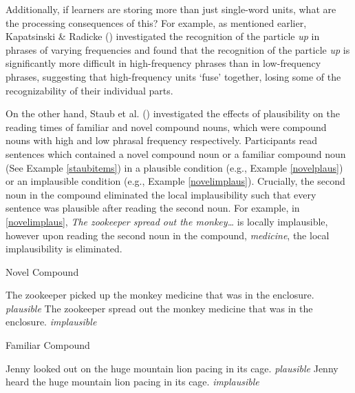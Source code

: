 \documentclass[
  12pt,
  letterpaper,
]{scrreport}
\begin{document}
Additionally, if learners are storing more than just single-word units,
what are the processing consequences of this? For example, as mentioned
earlier, Kapatsinski \& Radicke
()
investigated the recognition of the particle \emph{up} in phrases of
varying frequencies and found that the recognition of the particle
\emph{up} is significantly more difficult in high-frequency phrases than
in low-frequency phrases, suggesting that high-frequency units `fuse'
together, losing some of the recognizability of their individual parts.

On the other hand, Staub et al.
() investigated the
effects of plausibility on the reading times of familiar and novel
compound nouns, which were compound nouns with high and low phrasal
frequency respectively. Participants read sentences which contained a
novel compound noun or a familiar compound noun (See Example
\ref{staubitems}) in a plausible condition (e.g., Example
\ref{novelplaus}) or an implausible condition (e.g., Example
\ref{novelimplaus}). Crucially, the second noun in the compound
eliminated the local implausibility such that every sentence was
plausible after reading the second noun. For example, in
\ref{novelimplaus}, \emph{The zookeeper spread out the monkey\ldots{}}
is locally implausible, however upon reading the second noun in the
compound, \emph{medicine}, the local implausibility is eliminated.

\begin{exe}
\ex \label{staubitems}
\begin{xlist}
\ex Novel Compound \label{compound}
\begin{xlist}
\ex The zookeeper picked up the monkey medicine that was in the enclosure. \hfill \emph{plausible} \label{novelplaus}
\ex The zookeeper spread out the monkey medicine that was in the enclosure. \hfill \emph{implausible}\label{novelimplaus}
\end{xlist}
\ex Familiar Compound
\begin{xlist}
\ex Jenny looked out on the huge mountain lion pacing in its cage. \hfill \emph{plausible}\label{familiarplaus}
\ex Jenny heard the huge mountain lion pacing in its cage. \hfill \emph{implausible} \label{familiarimplaus}
\end{xlist}
\end{xlist}
\end{exe}
\end{document}
